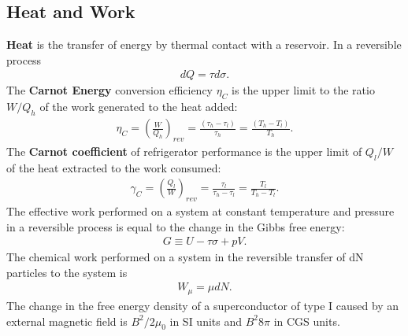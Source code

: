\begin{multicols}{2}
	\section{Heat and Work}
	\textbf{Heat} is the transfer of energy by thermal contact with a reservoir. In a reversible process
	\begin{align}
		dQ = \tau d\sigma.
	\end{align} 
	The \textbf{Carnot Energy} conversion efficiency $\eta_C$ is the upper limit to the ratio $W/Q_h$ of the work generated to the heat added:
	\begin{align}
		\eta_C = \left(\frac{W}{Q_h}\right)_{rev} = \frac{(\tau_h-\tau_l)}{\tau_h}=\frac{(T_h-T_l)}{T_h}.
	\end{align}
	The \textbf{Carnot coefficient} of refrigerator performance is the upper limit of $Q_l/W$ of the heat extracted to the work consumed:
	\begin{align}
		\gamma_C = \left(\frac{Q_l}{W}\right)_{rev} = \frac{\tau_l}{\tau_h-\tau_l} = \frac{T_l}{T_h-T_l}.
	\end{align} 
	The effective work performed on a system at constant temperature and pressure in a reversible process is equal to the change in the Gibbs free energy:
	\begin{align}
		G\equiv U-\tau \sigma+pV. 
	\end{align}
	The chemical work performed on a system in the reversible transfer of dN particles to the system is 
	\begin{align}
		W_\mu = \mu dN.
	\end{align} 
	The change in the free energy density of a superconductor of type I caused by an external magnetic field is $B^2/	2\mu_0$ in SI units and $B^2 8 \pi$ in CGS units.

\end{multicols}
